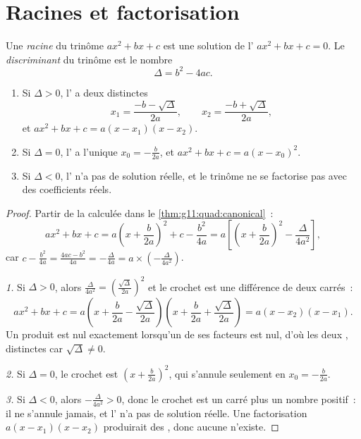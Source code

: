 \section{Racines et factorisation}

\begin{definition}\label{def:g11:quad:discriminant}
Une \emph{racine} du trinôme $ax^2+bx+c$ est une solution de
l' $ax^2 + bx + c = 0$. Le
\emph{discriminant} du trinôme est le nombre
\[
\Delta = b^2 - 4ac .
\]
\end{definition}

\begin{theorem}[Résoudre $ax^2+bx+c=0$]\label{thm:g11:quad:roots}
\begin{enumerate}
  \item Si $\Delta > 0$, l' a deux  distinctes
        \[
        x_1 = \frac{-b - \sqrt{\Delta}}{2a},
        \qquad
        x_2 = \frac{-b + \sqrt{\Delta}}{2a},
        \]
        et $ax^2+bx+c = a(x - x_1)(x - x_2)$.
  \item Si $\Delta = 0$, l' a l'unique 
        $x_0 = -\frac{b}{2a}$, et $ax^2+bx+c = a(x - x_0)^2$.
  \item Si $\Delta < 0$, l' n'a pas de solution réelle, et le
        trinôme ne se factorise pas avec des coefficients réels.
\end{enumerate}
\end{theorem}

\begin{proof}
Partir de la  calculée dans le
\cref{thm:g11:quad:canonical}~:
\[
ax^2+bx+c
= a\left(x + \frac{b}{2a}\right)^2 + c - \frac{b^2}{4a}
= a\left[\left(x + \frac{b}{2a}\right)^2 - \frac{\Delta}{4a^2}\right],
\]
car $c - \frac{b^2}{4a} = \frac{4ac - b^2}{4a} = -\frac{\Delta}{4a} =
a \times \left(-\frac{\Delta}{4a^2}\right)$.

\emph{1.} Si $\Delta > 0$, alors $\frac{\Delta}{4a^2} =
\left(\frac{\sqrt\Delta}{2a}\right)^2$ et le crochet est une différence de
deux carrés~:
\[
ax^2+bx+c = a\left(x + \frac{b}{2a} - \frac{\sqrt\Delta}{2a}\right)
\left(x + \frac{b}{2a} + \frac{\sqrt\Delta}{2a}\right)
= a(x - x_2)(x - x_1).
\]
Un produit est nul exactement lorsqu'un de ses facteurs est nul, d'où les
deux , distinctes car $\sqrt\Delta \neq 0$.

\emph{2.} Si $\Delta = 0$, le crochet est
$\left(x + \frac{b}{2a}\right)^2$, qui s'annule seulement en
$x_0 = -\frac{b}{2a}$.

\emph{3.} Si $\Delta < 0$, alors $-\frac{\Delta}{4a^2} > 0$, donc le
crochet est un carré plus un nombre positif~: il ne s'annule jamais, et
l' n'a pas de solution réelle. Une factorisation
$a(x-x_1)(x-x_2)$ produirait des , donc aucune n'existe.
\end{proof}

